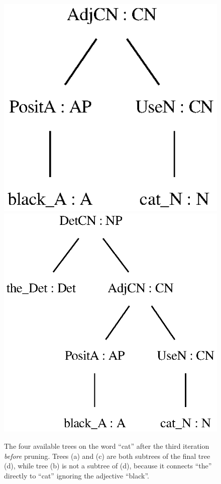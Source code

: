 \begin{figure}
        {\includegraphics[scale=0.6]{thesis/figure/black_cats/black_cat_CN_gf.eps}}
        {\includegraphics[scale=0.6]{thesis/figure/black_cats/the_black_cat_NP_gf.eps}}
    \caption{The four available trees on the word ``cat'' after the third iteration \emph{before} pruning. Trees (a) and (c) are both subtrees of the final tree (d), while tree (b) is not a subtree of (d), because it connects ``the'' directly to ``cat'' ignoring the adjective ``black''.}\label{fig:cat iter 3}
\end{figure}


